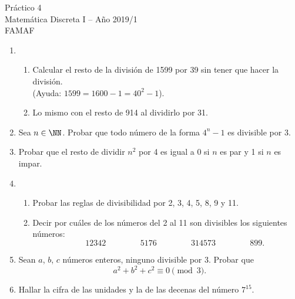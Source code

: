 \documentclass[12pt,spanish,makeidx]{amsbook}
\begin{document}
{\bf \begin{center} Práctico 4 \\ Matemática Discreta I -- Año 2019/1 \\ FAMAF \end{center}}

\smallskip


\begin{enumerate}
\item  
\begin{enumerate}
	\item Calcular el resto de la divisi\'on de 1599 por 39 sin tener que hacer la divisi\'on. \\(Ayuda: $1599=1600-1=40^2-1$).
	\item Lo mismo con el resto de 914 al dividirlo por 31.
\end{enumerate}


\smallskip
\item Sea $n\in\NN$. Probar que todo n\'umero de la forma $4^n-1$ es divisible por 3.

\smallskip
\item Probar que el resto de dividir $n^2$ por 4 es igual a 0 si $n$ es par y 1 si $n$ es impar.



\smallskip
\item
\begin{enumerate}
\item
Probar las reglas de divisibilidad por 2, 3, 4, 5, 8, 9 y 11.%
\item Decir por cu\'ales de los n\'umeros del 2 al 11 son divisibles los siguientes n\'umeros:
$$ \qquad 12342  \, \qquad   \qquad  5176 \, \qquad \qquad  314573\,  \qquad  \qquad  899.$$
\end{enumerate}


\smallskip
\item Sean $a$, $b$, $c$ n\'umeros enteros, ninguno divisible por 3. Probar que 
$$a^2 + b^2 + c^2\equiv 0 \pmod 3.$$%


\smallskip
\item Hallar la cifra de las unidades y la de las decenas del n\'umero $7^{15}$.



\end{enumerate}
\end{document}
